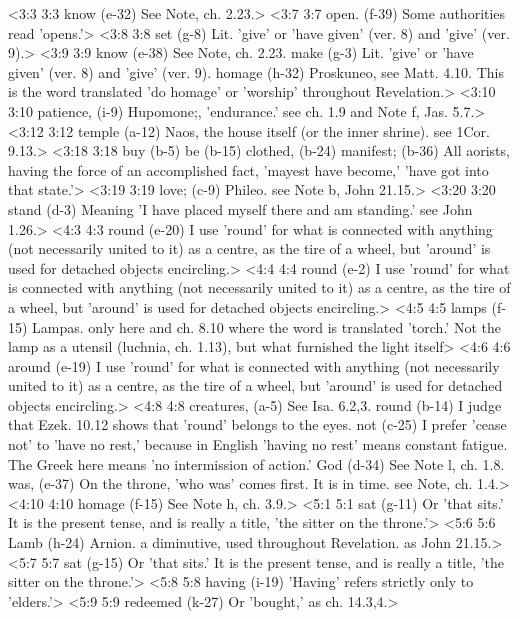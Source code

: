 <3:3 3:3  know (e-32) See Note, ch. 2.23.>
<3:7 3:7  open. (f-39)  Some authorities read 'opens.'>
<3:8 3:8  set (g-8) Lit. 'give' or 'have given' (ver. 8) and 'give' (ver. 9).>
<3:9 3:9  know (e-38)  See Note, ch. 2.23.
  make (g-3)  Lit. 'give' or 'have given' (ver. 8) and 'give' (ver. 9).
  homage (h-32)  Proskuneo, see Matt. 4.10. This is the word translated 'do  homage' or 'worship' throughout Revelation.>
<3:10 3:10  patience, (i-9)  Hupomone;, 'endurance.' see ch. 1.9 and Note f, Jas. 5.7.>
<3:12 3:12  temple (a-12)  Naos, the house itself (or the inner shrine). see 1Cor. 9.13.>
<3:18 3:18  buy (b-5)  be (b-15)  clothed, (b-24)  manifest; (b-36)
  All aorists, having the force of an accomplished fact,  'mayest have become,' 'have got into that state.'>
<3:19 3:19  love; (c-9)  Phileo. see Note b, John 21.15.>
<3:20 3:20  stand (d-3)  Meaning 'I have placed myself there and am standing.' see  John 1.26.>
<4:3 4:3  round (e-20)  I use 'round' for what is connected with anything (not  necessarily united to it) as a centre, as the tire of a wheel,  but 'around' is used for detached objects encircling.>
<4:4 4:4  round (e-2)  I use 'round' for what is connected with anything (not  necessarily united to it) as a centre, as the tire of a wheel,  but 'around' is used for detached objects encircling.>
<4:5 4:5  lamps (f-15)  Lampas. only here and ch. 8.10 where the word is translated  'torch.' Not the lamp as a utensil (luchnia, ch. 1.13), but  what furnished the light itself>
<4:6 4:6  around (e-19)  I use 'round' for what is connected with anything (not  necessarily united to it) as a centre, as the tire of a wheel,  but 'around' is used for detached objects encircling.>
<4:8 4:8  creatures, (a-5)  See Isa. 6.2,3.
  round (b-14)  I judge that Ezek. 10.12 shows that 'round' belongs to the  eyes.
  not (c-25)  I prefer 'cease not' to 'have no rest,' because in English  'having no rest' means constant fatigue. The Greek here means  'no intermission of action.'
  God (d-34)  See Note l, ch. 1.8.
  was, (e-37)  On the throne, 'who was' comes first. It is in time. see  Note, ch. 1.4.>
<4:10 4:10  homage (f-15)  See Note h, ch. 3.9.>
<5:1 5:1  sat (g-11)  Or 'that sits.' It is the present tense, and is really a title, 'the sitter on the throne.'>
<5:6 5:6  Lamb (h-24)  Arnion. a diminutive, used throughout Revelation. as John 21.15.>
<5:7 5:7  sat (g-15)  Or 'that sits.' It is the present tense, and is really a  title, 'the sitter on the throne.'>
<5:8 5:8  having (i-19)  'Having' refers strictly only to 'elders.'>
<5:9 5:9  redeemed (k-27)  Or 'bought,' as ch. 14.3,4.>
